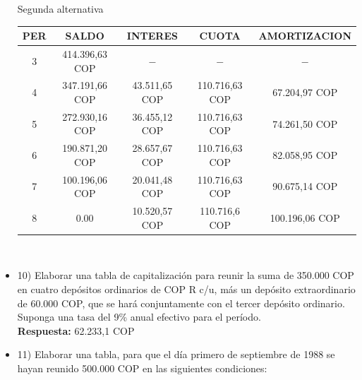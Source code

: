 \begin{itemize}
 Segunda alternativa
       \begin{center}
     \begin{tabular}{| c | c | c | c | c |}
    \hline
     \textbf{PER} & \textbf{SALDO} & \textbf{INTERES} & \textbf{CUOTA} & \textbf{AMORTIZACION}  \\ \hline
    3 & 414.396,63 COP & $-$ & $-$ &  $-$  \\ \hline
    4 & 347.191,66 COP & 43.511,65 COP & 110.716,63 COP &  67.204,97 COP \\ \hline
    5 & 272.930,16 COP & 36.455,12 COP & 110.716,63 COP &  74.261,50 COP \\ \hline
    6 & 190.871,20 COP & 28.657,67 COP & 110.716,63 COP & 82.058,95 COP \\ \hline
    7 & 100.196,06 COP & 20.041,48 COP & 110.716,63 COP & 90.675,14 COP \\ \hline
    8 & 0.00 & 10.520,57 COP & 110.716,6 COP &  100.196,06 COP \\ \hline
   
    \end{tabular}\\
 \end{center}
       \medskip

 \item 10)	 Elaborar una tabla de capitalización para reunir la suma de 350.000 COP en cuatro depósitos ordinarios de COP R c/u, más un depósito extraordinario de 60.000 COP, que se hará conjuntamente con el tercer depósito ordinario. Suponga una tasa del 9\% anual efectivo para el período.\\
       \textbf{ Respuesta:} 62.233,1 COP
       \medskip

 \item 11)	 Elaborar una tabla, para que el día primero de septiembre de 1988 se hayan reunido 500.000 COP en las siguientes condiciones:\\


\end{itemize}
